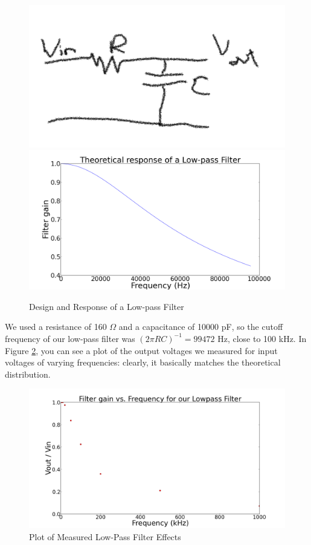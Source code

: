 \documentclass[11pt]{article}
\newcommand{\inv}{^{-1}}
\begin{document}
\begin{figure}
\centering
\includegraphics[scale=0.3]{lpcircuit}
\includegraphics[scale=0.25]{lowpass}
\caption{Design and Response of a Low-pass Filter \label{LPFD}}
\end{figure}
 We used a resistance of 160 $\Omega$ and a capacitance of 10000 pF, so the
cutoff frequency of our low-pass filter was $(2\pi RC)\inv = 99472$ Hz, close to 100 kHz. In Figure \ref{LPFR}, you can see a
plot of the output voltages we measured for input voltages of varying frequencies:
clearly, it basically matches the theoretical distribution. 
\begin{figure}
\centering
\includegraphics[scale=0.3]{lpresplot}
\caption{Plot of Measured Low-Pass Filter Effects \label{LPFR}}
\end{figure}
\end{document}
